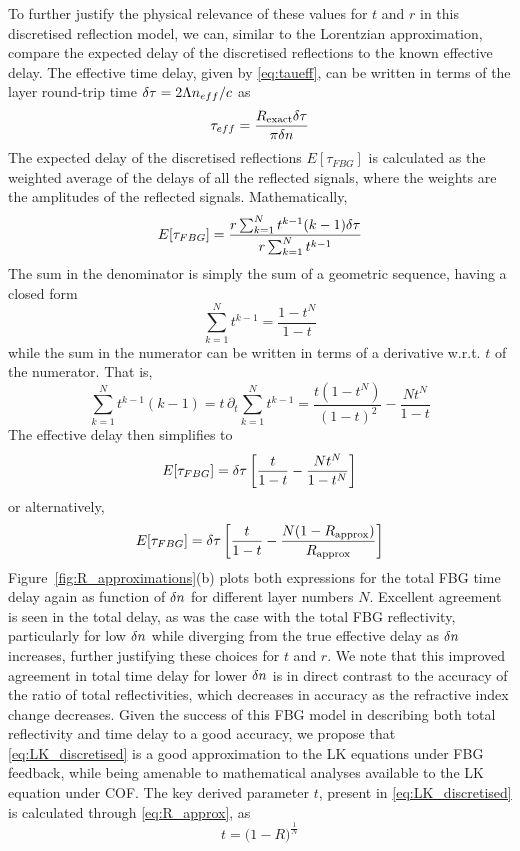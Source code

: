 %
To further justify the physical relevance of these values for $t$ and $r$ in this discretised reflection model, we can, similar to the Lorentzian approximation, compare the expected delay of the discretised reflections to the known effective delay. The effective time delay, given by \eqref{eq:taueff}, can be written in terms of the layer round-trip time $\delta \tau = 2 \Lambda n_{eff}/c$ as
%
\begin{equation}
    \tau_{eff} = \frac{R_\text{exact} \delta \tau}{\pi \delta n}
\end{equation}
%
The expected delay of the discretised reflections $E[\tau_{FBG}]$ is calculated as the weighted average of the delays of all the reflected signals, where the weights are the amplitudes of the reflected signals. Mathematically,
%
\begin{equation*}
    E[\tau_{FBG}] = \frac{r \sum_{k=1}^{N} t^{k-1} (k-1)\delta \tau}{r \sum_{k=1}^{N} t^{k-1}}
\end{equation*}
%
The sum in the denominator is simply the sum of a geometric sequence, having a closed form
%
\begin{equation*}
    \sum_{k=1}^{N} t^{k-1} = \frac{1-t^N}{1-t}
\end{equation*}
%
while the sum in the numerator can be written in terms of a derivative w.r.t. $t$ of the numerator. That is,
%
\begin{equation*}
    \sum_{k=1}^{N} t^{k-1} (k-1) = t \, \partial_t \sum_{k=1}^{N} t^{k-1} = \frac{t(1-t^N)}{(1-t)^2} - \frac{N t^N}{1-t}
\end{equation*}
%
The effective delay then simplifies to
%
\begin{equation*}
    E[\tau_{FBG}] = \delta \tau\left[ \frac{t}{1-t} - \frac{N t^N}{1-t^N} \right]
\end{equation*}
%
or alternatively,
%
\begin{equation*}
    E[\tau_{FBG}] = \delta \tau\left[ \frac{t}{1-t} - \frac{N (1-R_\text{approx})}{ R_\text{approx}} \right]
\end{equation*}
%
Figure~\ref{fig:R_approximations}(b) plots both expressions for the total FBG time delay again as function of $\delta n$ for different layer numbers $N$. Excellent agreement is seen in the total delay, as was the case with the total FBG reflectivity, particularly for low $\delta n$ while diverging from the true effective delay as $\delta n$ increases, further justifying these choices for $t$ and $r$. We note that this improved agreement in total time delay for lower $\delta n$ is in direct contrast to the accuracy of the ratio of total reflectivities, which decreases in accuracy as the refractive index change decreases. Given the success of this FBG model in describing both total reflectivity and time delay to a good accuracy, we propose that \eqref{eq:LK_discretised} is a good approximation to the LK equations under FBG feedback, while being amenable to mathematical analyses available to the LK equation under COF. The key derived parameter $t$, present in \eqref{eq:LK_discretised} is calculated through \eqref{eq:R_approx}, as
%
\begin{equation}
\label{eq:discretised_t}
    t =  \big( 1-R \big) ^\frac{1}{N}
\end{equation}
%
%
